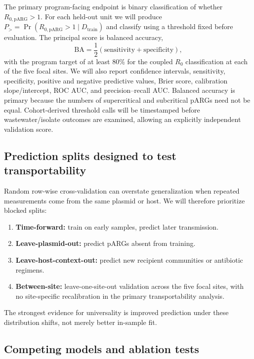 \documentclass[12pt,a4paper]{article}
\newcommand{\RpARG}{R_{0,\mathrm{pARG}}}
\newcommand{\Prob}{\Pr}
\begin{document}
The primary program-facing endpoint is binary classification of whether $\RpARG>1$. For each held-out unit we will produce $P_>=\Prob(\RpARG>1\mid D_{\mathrm{train}})$ and classify using a threshold fixed before evaluation. The principal score is balanced accuracy,
\begin{equation}
\mathrm{BA}=\frac{1}{2}(\mathrm{sensitivity}+\mathrm{specificity}),
\end{equation}
with the program target of at least 80\% for the coupled $R_0$ classification at each of the five focal sites. We will also report confidence intervals, sensitivity, specificity, positive and negative predictive values, Brier score, calibration slope/intercept, ROC AUC, and precision--recall AUC. Balanced accuracy is primary because the numbers of supercritical and subcritical pARGs need not be equal. Cohort-derived threshold calls will be timestamped before wastewater/isolate outcomes are examined, allowing an explicitly independent validation score.

\subsection{Prediction splits designed to test transportability}

Random row-wise cross-validation can overstate generalization when repeated measurements come from the same plasmid or host. We will therefore prioritize blocked splits:
\begin{enumerate}
\item \textbf{Time-forward:} train on early samples, predict later transmission.
\item \textbf{Leave-plasmid-out:} predict pARGs absent from training.
\item \textbf{Leave-host-context-out:} predict new recipient communities or antibiotic regimens.
\item \textbf{Between-site:} leave-one-site-out validation across the five focal sites, with no site-specific recalibration in the primary transportability analysis.
\end{enumerate}
The strongest evidence for universality is improved prediction under these distribution shifts, not merely better in-sample fit.

\subsection{Competing models and ablation tests}
\end{document}
